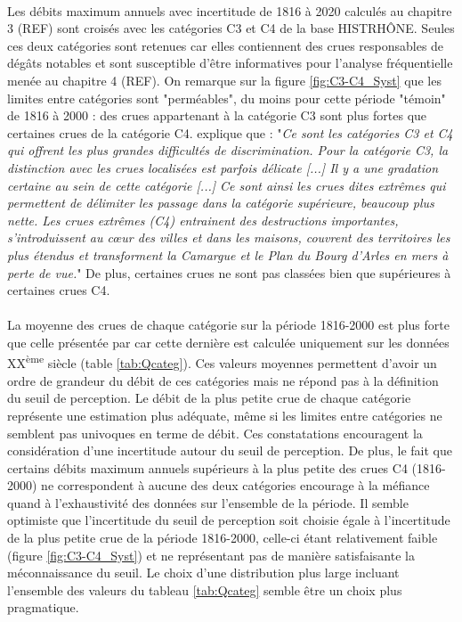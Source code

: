 \documentclass[11pt]{article}
\begin{document}
	\paragraph{} Les débits maximum annuels avec incertitude de 1816 à 2020 calculés au chapitre 3 (REF) sont croisés avec les catégories C3 et C4 de la base HISTRHÔNE. Seules ces deux catégories sont retenues car elles contiennent des crues responsables de dégâts notables et sont susceptible d'être informatives pour l'analyse fréquentielle menée au chapitre 4 (REF). On remarque sur la figure \ref{fig:C3-C4_Syst} que les limites entre catégories sont "perméables", du moins pour cette période "témoin" de 1816 à 2000 : des crues appartenant à la catégorie C3 sont plus fortes que certaines crues de la catégorie C4. \citet{pichard_sept_2014} explique que : "\textit{Ce sont les catégories C3 et C4 qui offrent les plus grandes difficultés de discrimination. Pour la catégorie C3, la distinction avec les crues localisées est parfois délicate [...] Il y a une gradation certaine au sein de cette catégorie [...] Ce sont ainsi les crues dites extrêmes qui permettent de délimiter les passage dans la catégorie supérieure, beaucoup plus nette. Les crues extrêmes (C4) entrainent des destructions importantes, s'introduissent au cœur des villes et dans les maisons, couvrent des territoires les plus étendus et transforment la Camargue et le Plan du Bourg d'Arles en mers à perte de vue.}" De plus, certaines crues ne sont pas classées bien que supérieures à certaines crues C4.	
	
	\paragraph{} La moyenne des crues de chaque catégorie sur la période 1816-2000 est plus forte que celle présentée par \citet{pichard_hydro-climatology_2017} car cette dernière est calculée uniquement sur les données XX\textsuperscript{ème} siècle (table \ref{tab:Qcateg}). Ces valeurs moyennes permettent d'avoir un ordre de grandeur du débit de ces catégories mais ne répond pas à la définition du seuil de perception. Le débit de la plus petite crue de chaque catégorie représente une estimation plus adéquate, même si les limites entre catégories ne semblent pas univoques en terme de débit. Ces constatations encouragent la considération d'une incertitude autour du seuil de perception. De plus, le fait que certains débits maximum annuels supérieurs à la plus petite des crues C4 (1816-2000) ne correspondent à aucune des deux catégories encourage à la méfiance quand à l'exhaustivité des données sur l'ensemble de la période. Il semble optimiste que l'incertitude du seuil de perception soit choisie égale à l'incertitude de la plus petite crue de la période 1816-2000, celle-ci étant relativement faible (figure \ref{fig:C3-C4_Syst}) et ne représentant pas de manière satisfaisante la méconnaissance du seuil. Le choix d'une distribution plus large incluant l'ensemble des valeurs du tableau \ref{tab:Qcateg} semble être un choix plus pragmatique.	
\end{document}
